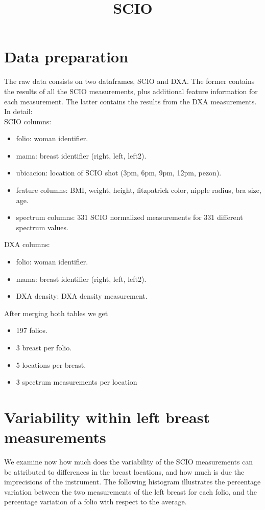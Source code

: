 \documentclass[a4paper,12pt]{article}
\begin{document}
\title{SCIO}
\maketitle

\section*{Data preparation}
The raw data consists on two dataframes, SCIO and DXA. The former contains the results of all the SCIO measurements, plus additional feature information for each measurement. The latter contains the results from the DXA measurements. In detail:\\

SCIO columns:
\begin{itemize}
	\item folio: woman identifier.
	\item mama: breast identifier (right, left, left2).
	\item ubicacion: location of SCIO shot (3pm, 6pm, 9pm, 12pm, pezon).
	\item feature columns: BMI, weight, height, fitzpatrick color, nipple radius, bra size, age.
	\item spectrum columns: 331 SCIO normalized measurements for 331 different spectrum values.
\end{itemize}

DXA columns:
\begin{itemize}
	\item folio: woman identifier.
	\item mama: breast identifier (right, left, left2).
	\item DXA density: DXA density measurement.
\end{itemize}

After merging both tables we get
\begin{itemize}
	\item 197 folios.
	\item 3 breast per folio.
	\item 5 locations per breast.
	\item 3 spectrum measurements per location
\end{itemize}

\section*{Variability within left breast measurements}
We examine now how much does the variability of the SCIO measurements can be attributed to differences in the breast locations, and how much is due the imprecisions of the instrument. The following histogram illustrates the percentage variation between the two measurements of the left breast for each folio, and the percentage variation of a folio with respect to the average.
\end{document}

